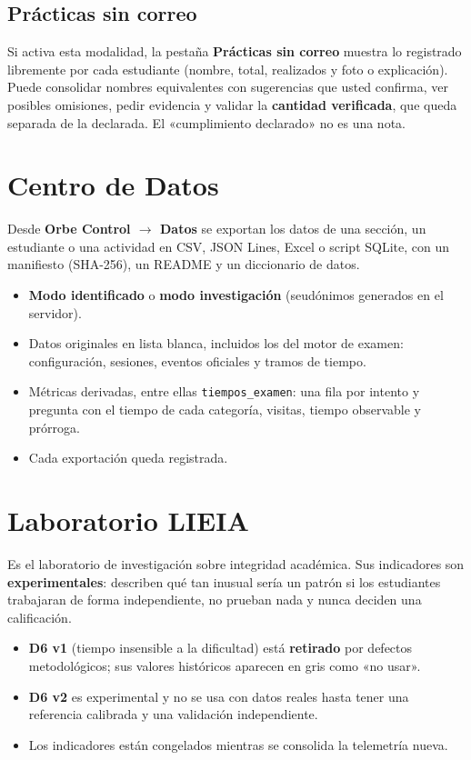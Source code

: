 \documentclass[11pt,a4paper,oneside]{book}
\newcommand{\menu}[1]{\textsf{\textbf{#1}}}
\begin{document}
\section{Prácticas sin correo}
Si activa esta modalidad, la pestaña \menu{Prácticas sin correo} muestra lo registrado libremente por cada estudiante
(nombre, total, realizados y foto o explicación). Puede consolidar nombres equivalentes con sugerencias que usted
confirma, ver posibles omisiones, pedir evidencia y validar la \textbf{cantidad verificada}, que queda separada de la
declarada. El «cumplimiento declarado» no es una nota.

\chapter{Centro de Datos}
Desde \textbf{Orbe Control $\rightarrow$ Datos} se exportan los datos de una sección, un estudiante o una actividad en
CSV, JSON Lines, Excel o script SQLite, con un manifiesto (SHA-256), un README y un diccionario de datos.

\begin{itemize}
  \item \textbf{Modo identificado} o \textbf{modo investigación} (seudónimos generados en el servidor).
  \item Datos originales en lista blanca, incluidos los del motor de examen: configuración, sesiones, eventos
        oficiales y tramos de tiempo.
  \item Métricas derivadas, entre ellas \texttt{tiempos\_examen}: una fila por intento y pregunta con el tiempo de cada
        categoría, visitas, tiempo observable y prórroga.
  \item Cada exportación queda registrada.
\end{itemize}

\chapter{Laboratorio LIEIA}
Es el laboratorio de investigación sobre integridad académica. Sus indicadores son \textbf{experimentales}: describen
qué tan inusual sería un patrón si los estudiantes trabajaran de forma independiente, no prueban nada y nunca deciden
una calificación.

\begin{itemize}
  \item \textbf{D6 v1} (tiempo insensible a la dificultad) está \textbf{retirado} por defectos metodológicos; sus
        valores históricos aparecen en gris como «no usar».
  \item \textbf{D6 v2} es experimental y no se usa con datos reales hasta tener una referencia calibrada y una
        validación independiente.
  \item Los indicadores están congelados mientras se consolida la telemetría nueva.
\end{itemize}
\end{document}
